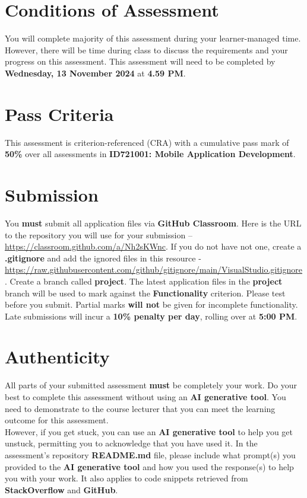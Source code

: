 \documentclass{article}
\begin{document}
\section*{Conditions of Assessment}
You will complete majority of this assessment during your learner-managed time. However, there will be time during class to discuss the requirements and your progress on this assessment. This assessment will need to be completed by \textbf{Wednesday, 13 November 2024} at \textbf{4.59 PM}.

\section*{Pass Criteria}
This assessment is criterion-referenced (CRA) with a cumulative pass mark of \textbf{50\%} over all assessments in \textbf{ID721001: Mobile Application Development}.

\section*{Submission}
You \textbf{must} submit all application files via \textbf{GitHub Classroom}. Here is the URL to the repository you will use for your submission – \href{https://classroom.github.com/a/Nh2sKWnc}{https://classroom.github.com/a/Nh2sKWnc}. If you do not have not one, create a \textbf{.gitignore} and add the ignored files in this resource - \href{https://raw.githubusercontent.com/github/gitignore/main/VisualStudio.gitignore}{https://raw.githubusercontent.com/github/gitignore/main/VisualStudio.gitignore}. Create a branch called \textbf{project}. The latest application files in the \textbf{project} branch will be used to mark against the \textbf{Functionality} criterion. Please test before you submit. Partial marks \textbf{will not} be given for incomplete functionality. Late submissions will incur a \textbf{10\% penalty per day}, rolling over at \textbf{5:00 PM}.

\section*{Authenticity}
All parts of your submitted assessment \textbf{must} be completely your work. Do your best to complete this assessment without using an \textbf{AI generative tool}. You need to demonstrate to the course lecturer that you can meet the learning outcome for this assessment. \\
 
 However, if you get stuck, you can use an \textbf{AI generative tool} to help you get unstuck, permitting you to acknowledge that you have used it. In the assessment's repository \textbf{README.md} file, please include what prompt(s) you provided to the \textbf{AI generative tool} and how you used the response(s) to help you with your work. It also applies to code snippets retrieved from \textbf{StackOverflow} and \textbf{GitHub}. \\
 
\end{document}
